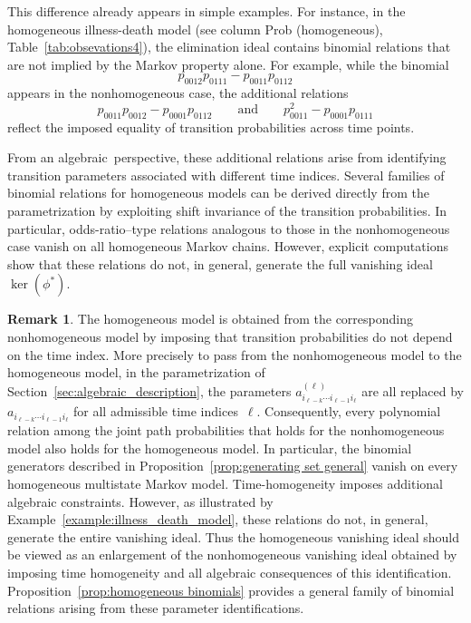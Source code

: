 \documentclass[11pt, a4paper]{article}
\numberwithin{equation}{section}
\theoremstyle{plain}
\theoremstyle{definition}
\newtheorem{remark}[theorem]{Remark}
\begin{document}
This difference already appears in simple examples.
For instance, in the homogeneous illness-death model
(see column Prob (homogeneous), Table~\ref{tab:obsevations4}),
the elimination ideal contains binomial relations that are not implied
by the Markov property alone.
For example, while the binomial 
\[
p_{0012}p_{0111}-p_{0011}p_{0112}
\]
appears in the nonhomogeneous case, the additional
relations
\[
p_{0011}p_{0012}-p_{0001}p_{0112}
\qquad\text{and}\qquad
p_{0011}^2-p_{0001}p_{0111}
\]
reflect the imposed equality of transition probabilities across time points.


From an algebraic~perspective, these additional relations arise from identifying transition
parameters associated with different time indices.
Several families of binomial relations for homogeneous models can be derived directly from the
parametrization by exploiting shift invariance of the transition probabilities.
In particular, odds-ratio–type relations analogous to those in the nonhomogeneous case
vanish on all homogeneous Markov chains.
However, explicit computations show that these relations do not, in general, generate the full
vanishing ideal $\ker(\phi^*)$.

\begin{remark}
The homogeneous model is obtained from the corresponding nonhomogeneous model by imposing that transition probabilities do not depend on the time index. More precisely to pass from the nonhomogeneous model to the homogeneous model, in the parametrization of Section~\ref{sec:algebraic_description}, the parameters
$a^{(\ell)}_{i_{\ell-k}\cdots i_{\ell-1}i_\ell}$
are all replaced by
$a_{i_{\ell-k}\cdots i_{\ell-1}i_\ell}$ for all admissible time indices~$\ell$.
Consequently, every polynomial relation among the joint path probabilities that holds for the nonhomogeneous model also holds for the homogeneous model. In particular, the binomial generators described in Proposition~\ref{prop:generating set general} vanish on every homogeneous multistate Markov model.
Time-homogeneity imposes additional algebraic constraints. However, as illustrated by Example~\ref{example:illness_death_model}, these relations do not, in general, generate the entire vanishing ideal. Thus the homogeneous vanishing ideal should be viewed as an enlargement of the nonhomogeneous vanishing ideal obtained by imposing time homogeneity and all algebraic consequences of this identification. Proposition~\ref{prop:homogeneous binomials} provides a general family of binomial relations arising from these parameter identifications. 
\end{remark}
\end{document}
